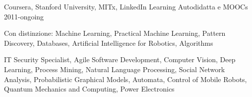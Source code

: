 \begin{cventries}
	\cventry%
		{Coursera, Stanford University, MITx, LinkedIn Learning}
		{Autodidatta e MOOCs}
		{}
		{2011-ongoing}
		{\begin{cvitems}
			\item {Con distinzione:
				Machine Learning,
				Practical Machine Learning,
				Pattern Discovery,
				Databases,
				Artificial Intelligence for Robotics,
				Algorithms
				}
			\item {%
				IT Security Specialist,
				Agile Software Development,
				Computer Vision,
				Deep Learning,
				Process Mining,
				Natural Language Processing,
				Social Network Analysis,
				Probabilistic Graphical Models,
				Automata,
				Control of Mobile Robots,
				Quantum Mechanics and Computing,
				Power Electronics
				}
		\end{cvitems}}
\end{cventries}
